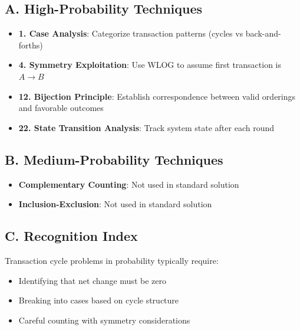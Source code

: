 \documentclass[]{article}
\begin{document}
\begin{techniquesbox}
\subsection*{A. High-Probability Techniques}
\begin{itemize}[leftmargin=*]
    \item \textbf{1. Case Analysis}: Categorize transaction patterns (cycles vs back-and-forths)
    \item \textbf{4. Symmetry Exploitation}: Use WLOG to assume first transaction is $A \to B$
    \item \textbf{12. Bijection Principle}: Establish correspondence between valid orderings and favorable outcomes
    \item \textbf{22. State Transition Analysis}: Track system state after each round
\end{itemize}

\subsection*{B. Medium-Probability Techniques}
\begin{itemize}[leftmargin=*]
    \item \textbf{Complementary Counting}: Not used in standard solution
    \item \textbf{Inclusion-Exclusion}: Not used in standard solution
\end{itemize}

\subsection*{C. Recognition Index}
Transaction cycle problems in probability typically require:
\begin{itemize}
    \item Identifying that net change must be zero
    \item Breaking into cases based on cycle structure
    \item Careful counting with symmetry considerations
\end{itemize}
\end{techniquesbox}
\end{document}
